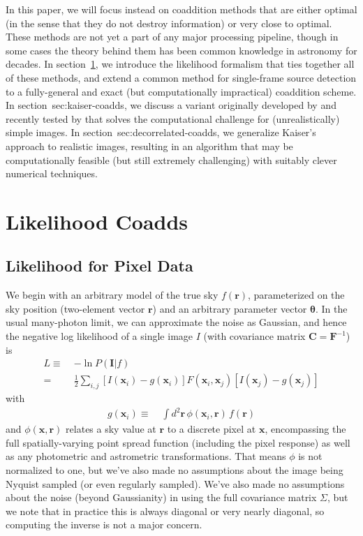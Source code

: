 \documentclass[10pt]{article}
\begin{document}
In this paper, we will focus instead on coaddition methods that are either optimal (in the sense that they do not destroy information) or very close to optimal.  These methods are not yet a part of any major processing pipeline, though in some cases the theory behind them has been common knowledge in astronomy for decades.  In section~\ref{sec:likelihood-coadds}, we introduce the likelihood formalism that ties together all of these methods, and extend a common method for single-frame source detection to a fully-general and exact (but computationally impractical) coaddition scheme.  In section~{sec:kaiser-coadds}, we discuss a variant originally developed by \cite{Kaiser2001} and recently tested by \cite{2015arXiv151206879Z} that solves the computational challenge for (unrealistically) simple images.  In section~{sec:decorrelated-coadds}, we generalize Kaiser's approach to realistic images, resulting in an algorithm that may be computationally feasible (but still extremely challenging) with suitably clever numerical techniques.

\section{Likelihood Coadds}
\label{sec:likelihood-coadds}

\subsection{Likelihood for Pixel Data}
\label{sec:pixel-likelihood}

We begin with an arbitrary model of the true sky $f(\bm{r})$, parameterized on the sky position (two-element vector $\bm{r}$) and an arbitrary parameter vector $\bm{\theta}$.  In the usual many-photon limit, we can approximate the noise as Gaussian, and hence the negative log likelihood of a single image $I$ (with covariance matrix $\bm{C}=\bm{F}^{-1}$) is
\begin{align}
    L \equiv\;& -\ln P(\bm{I}|f) \\
    =\;& \frac{1}{2} \sum_{i,j}
        \left[I(\bm{x}_i) - g(\bm{x}_i)\right]
        F(\bm{x}_i,\bm{x}_j)
        \left[I(\bm{x}_j) - g(\bm{x}_j)\right]
    \label{eqn:original-likelihood}
\end{align}
with
\begin{align}
g(\bm{x}_i) \equiv\;&
    \int\! d^2 \bm{r} \, \phi(\bm{x}_i,\bm{r}) \, f(\bm{r})
    \label{eqn:convolved-model-def}
\end{align}
and $\phi(\bm{x},\bm{r})$ relates a sky value at $\bm{r}$ to a discrete pixel at $\bm{x}$, encompassing the full spatially-varying point spread function (including the pixel response) as well as any photometric and astrometric transformations.  That means $\phi$ is not normalized to one, but we've also made no assumptions about the image being Nyquist sampled (or even regularly sampled).  We've also made no assumptions about the noise (beyond Gaussianity) in using the full covariance matrix $\Sigma$, but we note that in practice this is always diagonal or very nearly diagonal, so computing the inverse is not a major concern.
\end{document}
